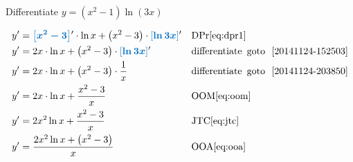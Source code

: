 \documentclass[20150903-160354-rs2.2-MarksMathNotebook.tex]{subfiles}
\begin{document}
\begin{example}[id:20141124-205219] \label{20141124-205219} \hfill \\

Differentiate $y=\left(x^2-1 \right) \ln(3x)$

\soln

\solnsteps
\begin{align*}
y' &= \farg{x^2-3}' \cdot \ln x + \left(x^2-3\right) \cdot \farg{\ln 3x}' && \text{DPr} \eqref{eq:dpr1} \\
y' &= 2x \cdot \ln x + \left(x^2-3\right) \cdot \farg{\ln 3x}' && \text{differentiate} \text{\, goto \,} \, \ref{20141124-152503} \\
y' &= 2x \cdot \ln x + \left(x^2-3\right) \cdot \dfrac{1}{x}  &&\text{differentiate} \text{\, goto \,} \, \ref{20141124-203850}\\
y' &= 2x \cdot \ln x + \dfrac{x^2-3}{x} && \text{OOM} \eqref{eq:oom} \\
y' &= 2x^2 \ln x +\dfrac{x^2-3}{x} && \text{JTC} \eqref{eq:jtc} \\
y' &= \dfrac{2x^2 \ln x + \left(x^2-3\right)}{x} && \text{OOA} \eqref{eq:ooa}
\end{align*}
\end{example}
\end{document}
